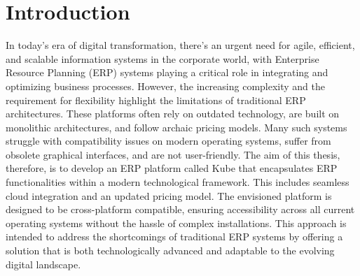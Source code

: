 \chapter{Introduction}
In today's era of digital transformation, there's an urgent need for agile, efficient, and scalable
information systems in the corporate world, with Enterprise Resource Planning (ERP) systems playing
a critical role in integrating and optimizing business processes. However, the increasing complexity
and the requirement for flexibility highlight the limitations of traditional ERP architectures.
These platforms often rely on outdated technology, are built on monolithic architectures, and follow
archaic pricing models. Many such systems struggle with compatibility issues on modern operating
systems, suffer from obsolete graphical interfaces, and are not user-friendly.
\newline\newline
The aim of this thesis, therefore, is to develop an ERP platform called Kube that encapsulates ERP
functionalities within a modern technological framework. This includes seamless cloud integration
and an updated pricing model. The envisioned platform is designed to be cross-platform compatible,
ensuring accessibility across all current operating systems without the hassle of complex
installations. This approach is intended to address the shortcomings of traditional ERP systems by
offering a solution that is both technologically advanced and adaptable to the evolving digital
landscape.

